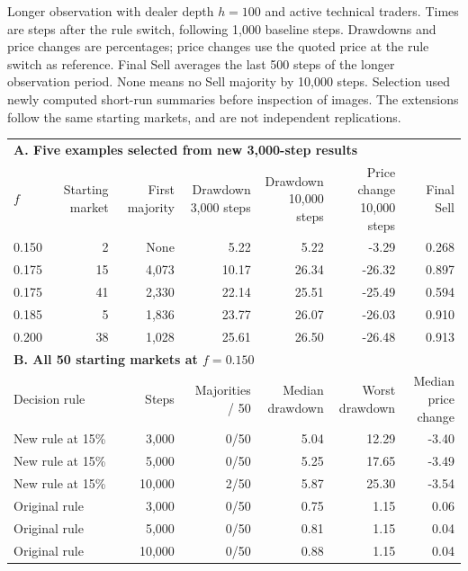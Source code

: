 \begin{center}
\begin{minipage}{\linewidth}\centering
\captionsetup{type=table,hypcap=false}
\caption{Longer observation with dealer depth $h=100$ and active technical traders. Times are steps after the rule switch, following 1,000 baseline steps. Drawdowns and price changes are percentages; price changes use the quoted price at the rule switch as reference. Final Sell averages the last 500 steps of the longer observation period. None means no Sell majority by 10,000 steps. Selection used newly computed short-run summaries before inspection of images. The extensions follow the same starting markets, and are not independent replications.}
\label{tab:market-panel-horizons}
\footnotesize\setlength{\tabcolsep}{2.5pt}
\begin{tabular}{lrrrrrr}
\toprule
\multicolumn{7}{l}{\textbf{A. Five examples selected from new 3,000-step results}} \\
$f$ & Starting market & First majority & \shortstack{Drawdown\\3,000 steps} & \shortstack{Drawdown\\10,000 steps} & \shortstack{Price change\\10,000 steps} & Final Sell \\
0.150 & 2 & None & 5.22 & 5.22 & -3.29 & 0.268 \\
0.175 & 15 & 4,073 & 10.17 & 26.34 & -26.32 & 0.897 \\
0.175 & 41 & 2,330 & 22.14 & 25.51 & -25.49 & 0.594 \\
0.185 & 5 & 1,836 & 23.77 & 26.07 & -26.03 & 0.910 \\
0.200 & 38 & 1,028 & 25.61 & 26.50 & -26.48 & 0.913 \\
\midrule
\multicolumn{7}{l}{\textbf{B. All 50 starting markets at $f=0.150$}} \\
\multicolumn{2}{l}{Decision rule} & Steps & Majorities / 50 & \shortstack{Median\\drawdown} & \shortstack{Worst\\drawdown} & \shortstack{Median\\price change} \\
\multicolumn{2}{l}{New rule at 15\%} & 3,000 & 0/50 & 5.04 & 12.29 & -3.40 \\
\multicolumn{2}{l}{New rule at 15\%} & 5,000 & 0/50 & 5.25 & 17.65 & -3.49 \\
\multicolumn{2}{l}{New rule at 15\%} & 10,000 & 2/50 & 5.87 & 25.30 & -3.54 \\
\multicolumn{2}{l}{Original rule} & 3,000 & 0/50 & 0.75 & 1.15 & 0.06 \\
\multicolumn{2}{l}{Original rule} & 5,000 & 0/50 & 0.81 & 1.15 & 0.04 \\
\multicolumn{2}{l}{Original rule} & 10,000 & 0/50 & 0.88 & 1.15 & 0.04 \\
\bottomrule
\end{tabular}
\end{minipage}
\end{center}
